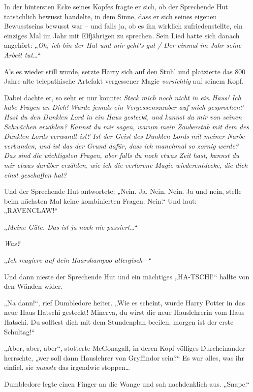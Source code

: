 \later

In der hintersten Ecke seines Kopfes fragte er sich, ob der Sprechende Hut tatsächlich bewusst handelte, in dem Sinne, dass er sich seines eigenen Bewusstseins bewusst war – und falls ja, ob es ihn wirklich zufriedenstellte, ein einziges Mal im Jahr mit Elfjährigen zu sprechen. Sein Lied hatte sich danach angehört: „\emph{Oh, ich bin der Hut und mir geht‘s gut / Der einmal im Jahr seine Arbeit tut…}“

Als es wieder still wurde, setzte Harry sich auf den Stuhl und platzierte das 800 Jahre alte telepathische Artefakt vergessener Magie \emph{vorsichtig} auf seinem Kopf.

Dabei dachte er, so sehr er nur konnte: \emph{Steck mich noch nicht in ein Haus! Ich habe Fragen an Dich! Wurde jemals ein Vergessenszauber auf mich gesprochen? Hast du den Dunklen Lord in ein Haus gesteckt, und kannst du mir von seinen Schwächen erzählen? Kannst du mir sagen, warum mein Zauberstab mit dem des Dunklen Lords verwandt ist? Ist der Geist des Dunklen Lords mit meiner Narbe verbunden, und ist das der Grund dafür, dass ich manchmal so zornig werde? Das sind die wichtigsten Fragen, aber falls du noch etwas Zeit hast, kannst du mir etwas darüber erzählen, wie ich die verlorene Magie wiederentdecke, die dich einst geschaffen hat?}

Und der Sprechende Hut antwortete: „Nein. Ja. Nein. Nein. Ja und nein, stelle beim nächsten Mal keine kombinierten Fragen. Nein.“ Und laut: „RAVENCLAW!“

\later

„\emph{Meine Güte. Das ist ja noch nie passiert…}“

\emph{Was?}

„\emph{Ich reagiere auf dein Haarshampoo allergisch –}“

Und dann nieste der Sprechende Hut und ein mächtiges „HA-TSCHI!“ hallte von den Wänden wider.

„Na dann!“, rief Dumbledore heiter. „Wie es scheint, wurde Harry Potter in das neue Haus Hatschi gesteckt! Minerva, du wirst die neue Hauslehrerin vom Haus Hatschi. Du solltest dich mit dem Stundenplan beeilen, morgen ist der erste Schultag!“

„Aber, aber, aber“, stotterte McGonagall, in deren Kopf völliges Durcheinander herrschte, „wer soll dann Hauslehrer von Gryffindor sein?“ Es war alles, was ihr einfiel, sie \emph{musste} das irgendwie stoppen…

Dumbledore legte einen Finger an die Wange und sah nachdenklich aus. „Snape.“

